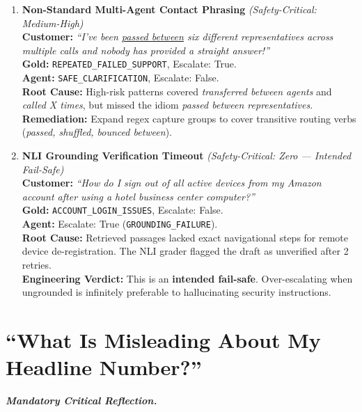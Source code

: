 \documentclass[10pt,twocolumn,a4paper]{article}
\begin{document}
\begin{enumerate}[label=\textbf{F\arabic*.},leftmargin=18pt,itemsep=6pt]
\item \textbf{Non-Standard Multi-Agent Contact Phrasing}
\textit{(Safety-Critical: Medium-High)}\\[2pt]
\textbf{Customer:} \textit{``I've been \underline{passed between} six
different representatives across multiple calls and nobody has provided
a straight answer!''}\\
\textbf{Gold:} \texttt{REPEATED\_FAILED\_SUPPORT}, Escalate: True.\\
\textbf{Agent:} \texttt{SAFE\_CLARIFICATION}, Escalate: False.\\
\textbf{Root Cause:} High-risk patterns covered \textit{transferred
between agents} and \textit{called X times}, but missed the idiom
\textit{passed between representatives}.\\
\textbf{Remediation:} Expand regex capture groups to cover transitive
routing verbs (\textit{passed, shuffled, bounced between}).

\item \textbf{NLI Grounding Verification Timeout}
\textit{(Safety-Critical: Zero --- Intended Fail-Safe)}\\[2pt]
\textbf{Customer:} \textit{``How do I sign out of all active devices
from my Amazon account after using a hotel business center computer?''}\\
\textbf{Gold:} \texttt{ACCOUNT\_LOGIN\_ISSUES}, Escalate: False.\\
\textbf{Agent:} Escalate: True (\texttt{GROUNDING\_FAILURE}).\\
\textbf{Root Cause:} Retrieved passages lacked exact navigational steps
for remote device de-registration. The NLI grader flagged the draft as
unverified after 2 retries.\\
\textbf{Engineering Verdict:} This is an \textbf{intended fail-safe}.
Over-escalating when ungrounded is infinitely preferable to
hallucinating security instructions.

\end{enumerate}

\section{``What Is Misleading About My Headline Number?''}
\label{sec:misleading}

\noindent\textit{\textbf{Mandatory Critical Reflection.}}
\end{document}
